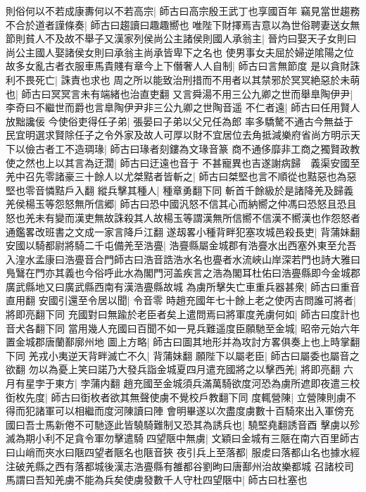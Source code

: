 則俗何以不若成康夀何以不若高宗|{
	師古曰高宗殷王武丁也享國百年}
竊見當世趨務不合於道者謹條奏|{
	師古曰趨讀曰趣趣嚮也}
唯陛下財擇焉吉意以為世俗聘妻送女無節則貧人不及故不舉子又漢家列侯尚公主諸侯則國人承翁主|{
	晉灼曰娶天子女則曰尚公主國人娶諸侯女則曰承翁主尚承皆卑下之名也}
使男事女夫屈於婦逆隂陽之位故多女亂古者衣服車馬貴賤有章今上下僭奢人人自制|{
	師古曰言無節度}
是以貪財誅利不畏死亡|{
	誅責也求也}
周之所以能致治刑措而不用者以其禁邪於冥冥絶惡於未萌也|{
	師古曰冥冥言未有端緒也治直吏翻}
又言舜湯不用三公九卿之世而舉臯陶伊尹|{
	李奇曰不繼世而爵也言臯陶伊尹非三公九卿之世陶音遥}
不仁者遠|{
	師古曰任用賢人放黜讒佞}
今使俗吏得任子弟|{
	張晏曰子弟以父兄任為郎}
率多驕驁不通古今無益于民宜明選求賢除任子之令外家及故人可厚以財不宜居位去角抵減樂府省尚方明示天下以儉古者工不造琱瑑|{
	師古曰瑑者刻鏤為文瑑音篆}
商不通侈靡非工商之獨賢政教使之然也上以其言為迂濶|{
	師古曰迂遠也音于}
不甚寵異也吉遂謝病歸　義渠安國至羌中召先零諸豪三十餘人以尤桀黠者皆斬之|{
	師古曰桀堅也言不順從也黠惡也為惡堅也零音憐黠戶入翻}
縱兵擊其種人|{
	種章勇翻下同}
斬首千餘級於是諸降羌及歸義羌侯楊玉等怨怒無所信郷|{
	師古曰恐中國汎怒不信其心而納嚮之仲馮曰恐怒且恐且怒也羌未有變而漢吏無故誅殺其人故楊玉等謂漢無所信嚮不信漢不嚮漢也作怨怒者通鑑畧改班書之文成一家言降戶江翻}
遂刼畧小種背畔犯塞攻城邑殺長吏|{
	背蒲妹翻}
安國以騎都尉將騎二千屯備羌至浩亹|{
	浩亹縣屬金城郡有浩亹水出西塞外東至允吾入湟水孟康曰浩亹音合門師古曰浩音誥浩水名也亹者水流峽山岸深若門也詩大雅曰鳬鷖在門亦其義也今俗呼此水為閣門河盖疾言之浩為閣耳杜佑曰浩亹縣即今金城郡廣武縣地又曰廣武縣西南有漢浩亹縣故城}
為虜所擊失亡車重兵器甚衆|{
	師古曰重音直用翻}
安國引還至令居以聞|{
	令音零}
時趙充國年七十餘上老之使丙吉問誰可將者|{
	將即亮翻下同}
充國對曰無踰於老臣者矣上遣問焉曰將軍度羌虜何如|{
	師古曰度計也音犬各翻下同}
當用幾人充國曰百聞不如一見兵難遥度臣願馳至金城|{
	昭帝元始六年置金城郡唐蘭鄯廓州地}
圖上方略|{
	師古曰圖其地形并為攻討方畧俱奏上也上時掌翻下同}
羌戎小夷逆天背畔滅亡不久|{
	背蒲妹翻}
願陛下以屬老臣|{
	師古曰屬委也屬音之欲翻}
勿以為憂上笑曰諾乃大發兵詣金城夏四月遣充國將之以擊西羌|{
	將即亮翻}
六月有星孛于東方|{
	孛蒲内翻}
趙充國至金城須兵滿萬騎欲度河恐為虜所遮即夜遣三校衘枚先度|{
	師古曰衘枚者欲其無聲使虜不覺校戶教翻下同}
度輒營陳|{
	立營陳則虜不得而犯諸軍可以相繼而度河陳讀曰陣}
會明畢遂以次盡度虜數十百騎來出入軍傍充國曰吾士馬新倦不可馳逐此皆驍騎難制又恐其為誘兵也|{
	驍堅堯翻誘音酉}
擊虜以殄滅為期小利不足貪令軍勿擊遣騎四望陿中無虜|{
	文穎曰金城有三陿在南六百里師古曰山峭而夾水曰陿四望者陿名也陿音狹}
夜引兵上至落都|{
	服䖍曰落都山名也據水經注破羌縣之西有落都城後漢志浩亹縣有雒都谷劉昫曰唐鄯州治故樂都城}
召諸校司馬謂曰吾知羌虜不能為兵矣使虜發數千人守杜四望陿中|{
	師古曰杜塞也}
